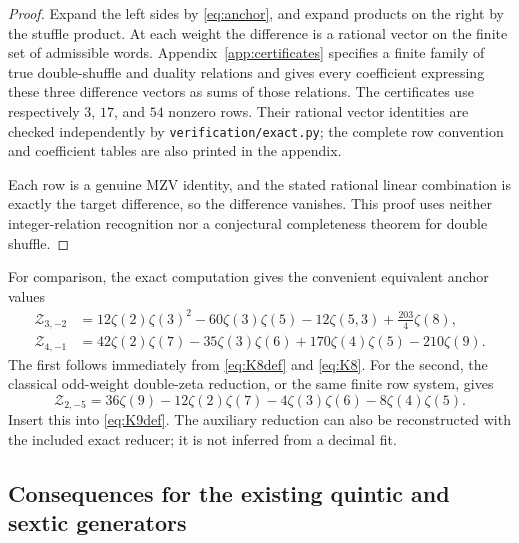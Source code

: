 \documentclass[11pt,letterpaper]{article}
\numberwithin{equation}{section}
\theoremstyle{definition}\newtheorem{definition}[theorem]{Definition}
\theoremstyle{remark}\newtheorem{remark}[theorem]{Remark}
\newcommand{\sref}[1]{\texttt{#1}}
\begin{document}
\begin{proof}
Expand the left sides by \eqref{eq:anchor}, and expand products on
the right by the stuffle product. At each weight the difference
is a rational vector on the finite set of admissible words.
Appendix~\ref{app:certificates} specifies a finite family of true
double-shuffle and duality relations and gives every coefficient
expressing these three difference vectors as sums of those relations.
The certificates use respectively $3$, $17$, and $54$ nonzero rows.
Their rational vector identities are checked independently by
\sref{verification/exact.py}; the complete row convention and
coefficient tables are also printed in the appendix.

Each row is a genuine MZV identity, and the stated rational linear
combination is exactly the target difference, so the difference
vanishes. This proof uses neither integer-relation recognition nor
a conjectural completeness theorem for double shuffle.
\end{proof}

For comparison, the exact computation gives the convenient equivalent
anchor values
\begin{align}
 \mathcal Z_{3,-2}
   &={}12\zeta(2)\zeta(3)^2-60\zeta(3)\zeta(5)
           -12\zeta(5,3)+\frac{203}{4}\zeta(8),\label{eq:Z3}\\
 \mathcal Z_{4,-1}
   &={}42\zeta(2)\zeta(7)-35\zeta(3)\zeta(6)
           +170\zeta(4)\zeta(5)-210\zeta(9).\label{eq:Z4}
\end{align}
The first follows immediately from \eqref{eq:K8def} and
\eqref{eq:K8}. For the second, the classical odd-weight double-zeta
reduction, or the same finite row system, gives
\[
 \mathcal Z_{2,-5}
 =36\zeta(9)-12\zeta(2)\zeta(7)-4\zeta(3)\zeta(6)
                                    -8\zeta(4)\zeta(5).
\]
Insert this into \eqref{eq:K9def}. The auxiliary reduction can also
be reconstructed with the included exact reducer; it is not inferred
from a decimal fit.

\subsection{Consequences for the existing quintic and sextic generators}
\end{document}
